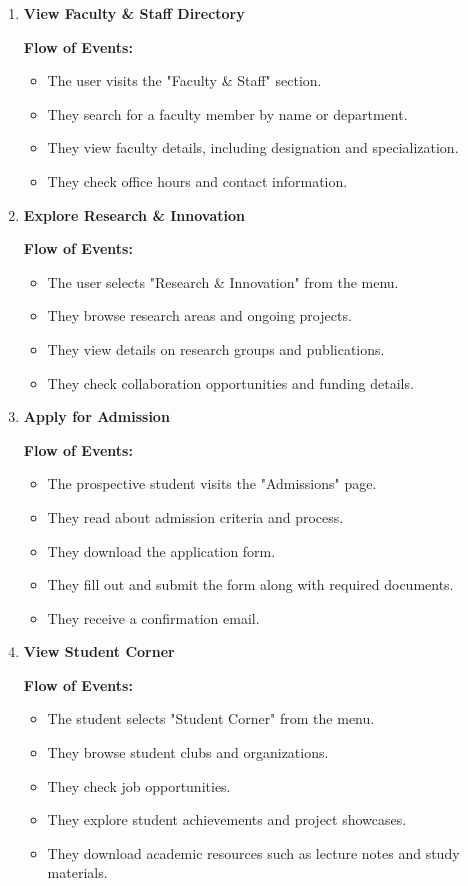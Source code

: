 \documentclass[11pt]{article}
\begin{document}
\begin{enumerate}
    \item \textbf{View Faculty \& Staff Directory} \par
    \textbf{Flow of Events:}
    \begin{itemize}
        \item The user visits the "Faculty \& Staff" section.
        \item They search for a faculty member by name or department.
        \item They view faculty details, including designation and specialization.
        \item They check office hours and contact information.
    \end{itemize}

    \item \textbf{Explore Research \& Innovation} \par
    \textbf{Flow of Events:}
    \begin{itemize}
        \item The user selects "Research \& Innovation" from the menu.
        \item They browse research areas and ongoing projects.
        \item They view details on research groups and publications.
        \item They check collaboration opportunities and funding details.
    \end{itemize}

    \item \textbf{Apply for Admission} \par
    \textbf{Flow of Events:}
    \begin{itemize}
        \item The prospective student visits the "Admissions" page.
        \item They read about admission criteria and process.
        \item They download the application form.
        \item They fill out and submit the form along with required documents.
        \item They receive a confirmation email.
    \end{itemize}

    \item \textbf{View Student Corner} \par
    \textbf{Flow of Events:}
    \begin{itemize}
        \item The student selects "Student Corner" from the menu.
        \item They browse student clubs and organizations.
        \item They check job opportunities.
        \item They explore student achievements and project showcases.
        \item They download academic resources such as lecture notes and study materials.
    \end{itemize}


\end{enumerate}
\end{document}
